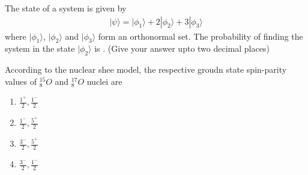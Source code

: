 \begin{figure}[H]
\centering
{}%
\end{figure}
\vspace{0.5cm}
\item The state of a system is given by 
\begin{align*}
    |\psi \rangle = |\phi_1\rangle+2|\phi_2\rangle+3|\phi_3\rangle
\end{align*}
where $|\phi_1\rangle$, $|\phi_2\rangle$ and $|\phi_3\rangle$ form an orthonormal set. The probability of finding the system in the state $|\phi_2\rangle$ is  \underline{\hspace{2cm}}. (Give your answer upto two decimal places)
\vspace{0.5cm}
\item According to the nuclear shee model, the respective groudn state spin-parity values of $^{15}_8O$ and $^{17}_8O$ nuclei are 
\begin{multicols}{2}
    \begin{enumerate}
        \item $\frac{1^{+}}{2},\frac{1^{-}}{2}$
        \item $\frac{1^-}{2},\frac{5^+}{2}$
        \item $\frac{3^-}{2},\frac{5^+}{2}$
        \item $\frac{3^-}{2},\frac{1^-}{2}$
    \end{enumerate}
\end{multicols}
